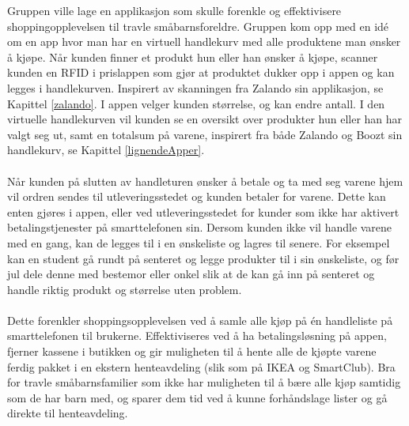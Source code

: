 Gruppen ville lage en applikasjon som skulle forenkle og effektivisere shoppingopplevelsen til travle småbarnsforeldre. Gruppen kom opp med en idé om en app hvor man har en virtuell handlekurv med alle produktene man ønsker å kjøpe. Når kunden finner et produkt hun eller han ønsker å kjøpe, scanner kunden en RFID i prislappen som gjør at produktet dukker opp i appen og kan legges i handlekurven. Inspirert av skanningen fra Zalando sin applikasjon, se Kapittel \ref{zalando}. I appen velger kunden størrelse, og kan endre antall. I den virtuelle handlekurven vil kunden se en oversikt over produkter hun eller han har valgt seg ut, samt en totalsum på varene, inspirert fra både Zalando og Boozt sin handlekurv, se Kapittel \ref{lignendeApper}. 
\\\\
Når kunden på slutten av handleturen ønsker å betale og ta med seg varene hjem vil ordren sendes til utleveringsstedet og kunden betaler for varene. Dette kan enten gjøres i appen, eller ved utleveringsstedet for kunder som ikke har aktivert betalingstjenester på smarttelefonen sin. Dersom kunden ikke vil handle varene med en gang, kan de legges til i en ønskeliste og lagres til senere. For eksempel kan en student gå rundt på senteret og legge produkter til i sin ønskeliste, og før jul dele denne med bestemor eller onkel slik at de kan gå inn på senteret og handle riktig produkt og størrelse uten problem.
\\\\
Dette forenkler shoppingsopplevelsen ved å samle alle kjøp på én handleliste på smarttelefonen til brukerne. Effektiviseres ved å ha betalingsløsning på appen,
fjerner kassene i butikken og gir muligheten til å hente alle de kjøpte varene ferdig pakket i en ekstern henteavdeling (slik som på IKEA og SmartClub). Bra for travle småbarnsfamilier som ikke har muligheten til å bære alle kjøp samtidig som de har barn med, og sparer dem tid ved å kunne forhåndslage lister og gå direkte til henteavdeling.

